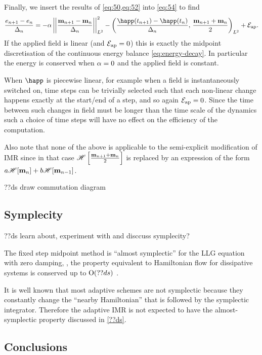 Finally, we insert the results of \cref{eq:50,eq:52} into \cref{eq:54} to find
\begin{equation}
  \frac{\e_{n+1} - \e_n}{\dtn}
  = -\dampc \ltnorm{\mpdmdt}^2
  - \ltip{\frac{\happ(t_{n+1}) -\happ(t_n)}{\dtn}}{\frac{\mv_{n+1} + \mv_{n}}{2}}
  + \happerror.
  \label{eqn:imr-llg-energy}
\end{equation}
If the applied field is linear (and $\mathcal{E}_\text{ap} = 0$) this is exactly the midpoint discretisation of the continuous energy balance \cref{eq:energy-decay}.
In particular the energy is conserved when $\alpha = 0$ and the applied field is constant.

When $\happ$ is piecewise linear, for example when a field is instantaneously switched on, time steps can be trivially selected such that each non-linear change happens exactly at the start/end of a step, and so again $\mathcal{E}_\text{ap} = 0$.
Since the time between such changes in field must be longer than the time scale of the dynamics such a choice of time steps will have no effect on the efficiency of the computation.

Also note that none of the above is applicable to the semi-explicit modification of IMR since in that case $\mathscr{H} \left[ \frac{\mathbf{m}_{n+1} + \mathbf{m}_n}{2} \right]$ is replaced by an expression of the form $a\mathscr{H} {\left[ \mathbf{m}_n \right]} + b\mathscr{H} {\left[ \mathbf{m}_{n-1} \right]}$.

??ds draw commutation diagram

\subsection{Symplecity}

??ds learn about, experiment with and disccuss symplecity?

The fixed step midpoint method is ``almost symplectic'' for the LLG equation with zero damping, , \ie the property equivalent to Hamiltonian flow for  dissipative systems is conserved up to $\text{O}{\left( ??ds \right)}$ \cite{DAquino2005} \cite{Austin1993}.

It is well known that most adaptive schemes are not symplectic\cite[91]{Iserles2009} because they constantly change the ``nearby Hamiltonian'' that is followed by the symplectic integrator.
Therefore the adaptive IMR is not expected to have the almost-symplectic property discussed in \cref{??ds}.


\subsection{Conclusions}

